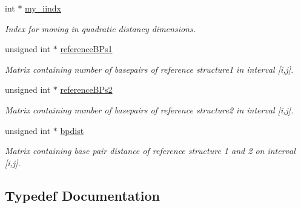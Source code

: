 \begin{DoxyCompactItemize}
int $\ast$ \mbox{\hyperlink{group__kl__neighborhood__mfe_a1a20cb06b58b75d1a3dbdbc8bc60d0a7}{my\+\_\+iindx}}
\begin{DoxyCompactList}\small\item\em Index for moving in quadratic distancy dimensions. \end{DoxyCompactList}\item 
\mbox{\label{group__kl__neighborhood__mfe_a536525b98c1b633d4c5f2da4f8d78c18}} 
unsigned int $\ast$ \mbox{\hyperlink{group__kl__neighborhood__mfe_a536525b98c1b633d4c5f2da4f8d78c18}{reference\+B\+Ps1}}
\begin{DoxyCompactList}\small\item\em Matrix containing number of basepairs of reference structure1 in interval \mbox{[}i,j\mbox{]}. \end{DoxyCompactList}\item 
\mbox{\label{group__kl__neighborhood__mfe_aa7abf73c3114cb5f0dc90e702fa9dd0f}} 
unsigned int $\ast$ \mbox{\hyperlink{group__kl__neighborhood__mfe_aa7abf73c3114cb5f0dc90e702fa9dd0f}{reference\+B\+Ps2}}
\begin{DoxyCompactList}\small\item\em Matrix containing number of basepairs of reference structure2 in interval \mbox{[}i,j\mbox{]}. \end{DoxyCompactList}\item 
\mbox{\label{group__kl__neighborhood__mfe_af1106e1a592e2dccc92b3452340549e0}} 
unsigned int $\ast$ \mbox{\hyperlink{group__kl__neighborhood__mfe_af1106e1a592e2dccc92b3452340549e0}{bpdist}}
\begin{DoxyCompactList}\small\item\em Matrix containing base pair distance of reference structure 1 and 2 on interval \mbox{[}i,j\mbox{]}. \end{DoxyCompactList}\end{DoxyCompactItemize}


\subsection{Typedef Documentation}
\mbox{\label{group__kl__neighborhood__mfe_ga6a81a58268d250309712549a3fa0aab2}} 
